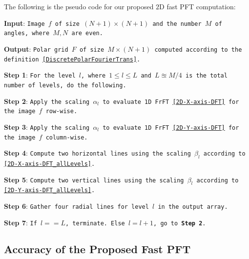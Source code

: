 \documentclass{UCF_ETD}
\begin{document}
 {
 The following is the pseudo code for our proposed $2$D fast PFT computation: %
 
 \textbf{Input}: {\tt Image $f$ of size $(N+1)\times (N+1)$ and  the number $M$ of angles, where $M,N$ are even.}
 
 \textbf{Output}:  {\tt Polar grid $F$ of size $M\times (N+1)$ computed according to the definition \eqref{DiscretePolarFourierTrans}.}
 
 \textbf{Step 1}: {\tt For the level $l$, where $1\leq l \leq L$ and $L \approxeq M/4$ is the total number of levels, do the following.}
 
 \textbf{Step 2}: {\tt Apply the scaling $\alpha_l$ to evaluate 1D FrFT \eqref{2D-X-axis-DFT} for the image $f$ row-wise.}
 
 \textbf{Step 3}: {\tt Apply the scaling $\alpha_l$ to evaluate  1D FrFT \eqref{2D-Y-axis-DFT} for the image $f$ column-wise.}
 
 \textbf{Step 4}:  {\tt Compute two horizontal lines using the scaling $\beta_l$ according to \eqref{2D-X-axis-DFT_allLevels}.}
 
 \textbf{Step 5}: {\tt Compute  two vertical lines using the scaling $\beta_l$ according to \eqref{2D-Y-axis-DFT_allLevels}.}
 
 \textbf{Step 6}: {\tt Gather four radial lines for level $l$ in the output array.}
 
 \textbf{Step 7}: {\tt If $l == L$, terminate. Else $l = l+1$, go to \textbf{Step 2}.}
 
 \subsection{Accuracy of the Proposed Fast PFT}
 
 
}
\end{document}
